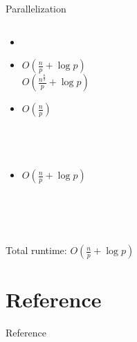 \documentclass[18pt]{beamer}
\begin{document}
\begin{frame}{Parallelization}
\begin{columns}
		\begin{itemize}\itemsep0pt
			\item[]  
			\vspace{8pt}
			\item[]$O(\frac{n}{p} + \log p)$\\ $O(\frac{n^{\frac{8}{9}}}{p} + \log p)$ \\ 					
			\item[]$O(\frac{n}{p})$\\\textcolor{white}{$|$} \\\textcolor{white}{$|$} \\ \textcolor{white}{$|$}\\  \textcolor{white}{$|$}\\
			\item[]$O(\frac{n}{p} + \log p)$\\\textcolor{white}{$|$} \\ \textcolor{white}{$|$} \\\textcolor{white}{$|$}\\
		\end{itemize}
\end{columns}
\vspace{2ex}
Total runtime: $O(\frac{n}{p} +\log p)$
\end{frame}

%

\appendix
\beginbackup

\nocite{major}
\nocite{dietzfelbinger1997reliable}
\nocite{fortune1978note}
\nocite{chap13}
\nocite{web}
\nocite{web2}
\nocite{web3}
\nocite{web4}
\nocite{khuller1995simple}
\nocite{Bentley:1976:DMS:800113.803652}
\nocite{chor1989power}


\section{Reference}
\begin{frame}[allowframebreaks]{Reference}
\printbibliography
\end{frame}



%
%
\end{document}
